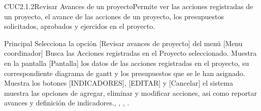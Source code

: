 %  
	\begin{UseCase}{CUC2.1.2}{Revisar Avances de un proyecto}{Permite ver las acciones registradas de un proyecto, el avance de las acciones de un proyecto, los presupuestos solicitados, aprobados y ejercidos en el proyecto.}
	\end{UseCase}
	
		
	\begin{UCtrayectoria}{Principal}
		\UCpaso[\UCactor] Selecciona la opción [Revisar avances de proyecto] del menú [Menu coordinador] 
		\UCpaso Busca las Acciones registradas en el Proyecto seleccionado.
		\UCpaso Muestra en la pantalla [Pantalla] los datos de las acciones registradas en el proyecto, su correspondiente diagrama de gantt y los presupuestos que se le han asignado.
		\UCpaso Muestra los botones [INDICADORES], [EDITAR] y [Cancelar]  
		\UCpaso el sistema muestra las opciones de agregar, eliminar y modificar acciones, asi como reportar avances y definición de indicadores., , , .
	\end{UCtrayectoria}
	
